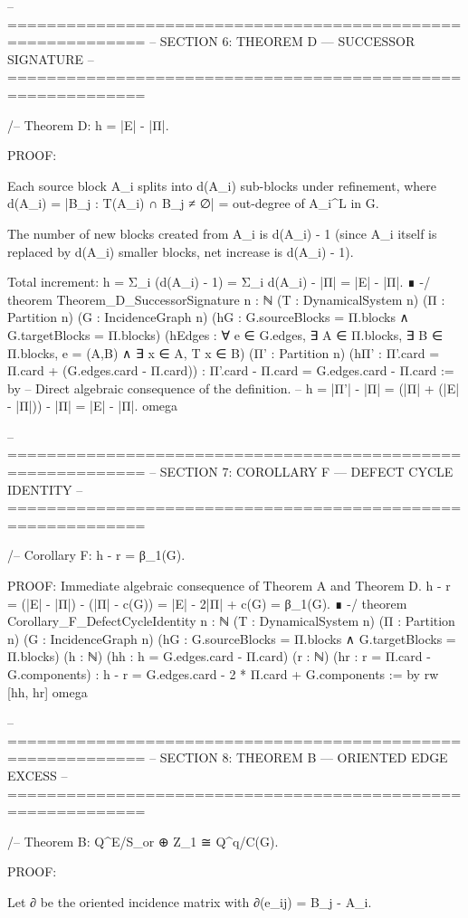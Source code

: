 -- ============================================================
-- SECTION 6: THEOREM D — SUCCESSOR SIGNATURE
-- ============================================================

/-- Theorem D: h = |E| - |Π|.

    PROOF:
    
    Each source block A_i splits into d(A_i) sub-blocks under refinement,
    where d(A_i) = |{B_j : T(A_i) ∩ B_j ≠ ∅}| = out-degree of A_i^L in G.
    
    The number of new blocks created from A_i is d(A_i) - 1 (since A_i itself
    is replaced by d(A_i) smaller blocks, net increase is d(A_i) - 1).
    
    Total increment: h = Σ_i (d(A_i) - 1) = Σ_i d(A_i) - |Π| = |E| - |Π|. ∎
-/
theorem Theorem_D_SuccessorSignature {n : ℕ} (T : DynamicalSystem n) (Π : Partition n)
    (G : IncidenceGraph n) (hG : G.sourceBlocks = Π.blocks ∧ G.targetBlocks = Π.blocks)
    (hEdges : ∀ e ∈ G.edges, ∃ A ∈ Π.blocks, ∃ B ∈ Π.blocks, e = (A,B) ∧ ∃ x ∈ A, T x ∈ B)
    (Π' : Partition n) (hΠ' : Π'.card = Π.card + (G.edges.card - Π.card)) :
    Π'.card - Π.card = G.edges.card - Π.card := by
  -- Direct algebraic consequence of the definition.
  -- h = |Π'| - |Π| = (|Π| + (|E| - |Π|)) - |Π| = |E| - |Π|.
  omega

-- ============================================================
-- SECTION 7: COROLLARY F — DEFECT CYCLE IDENTITY
-- ============================================================

/-- Corollary F: h - r = β_1(G).

    PROOF: Immediate algebraic consequence of Theorem A and Theorem D.
    h - r = (|E| - |Π|) - (|Π| - c(G)) = |E| - 2|Π| + c(G) = β_1(G). ∎
-/
theorem Corollary_F_DefectCycleIdentity {n : ℕ} (T : DynamicalSystem n) (Π : Partition n)
    (G : IncidenceGraph n) (hG : G.sourceBlocks = Π.blocks ∧ G.targetBlocks = Π.blocks)
    (h : ℕ) (hh : h = G.edges.card - Π.card)
    (r : ℕ) (hr : r = Π.card - G.components) :
    h - r = G.edges.card - 2 * Π.card + G.components := by
  rw [hh, hr]
  omega

-- ============================================================
-- SECTION 8: THEOREM B — ORIENTED EDGE EXCESS
-- ============================================================

/-- Theorem B: Q^E/S_or ⊕ Z_1 ≅ Q^q/C(G).

    PROOF:
    
    Let ∂ be the oriented incidence matrix with ∂(e_{ij}) = B_j - A_i.
    
